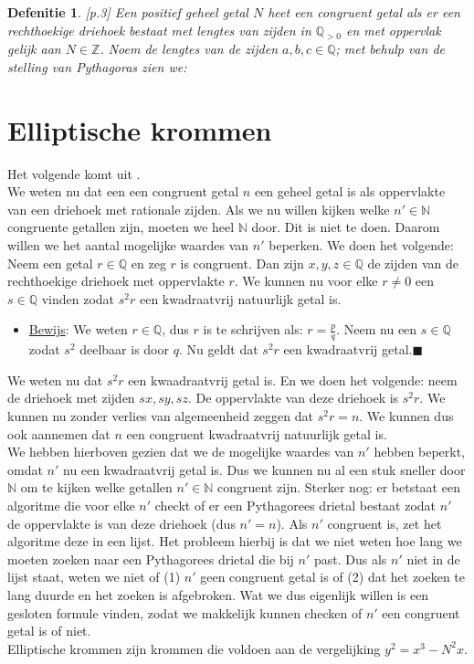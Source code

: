 \documentclass[12pt,reqno]{article}
\newcommand*{\NN}{\ensuremath{\mathbb{N}}}
\newcommand*{\ZZ}{\ensuremath{\mathbb{Z}}}
\newcommand*{\QQ}{\ensuremath{\mathbb{Q}}}
\newcommand*{\QED}{\hfill\ensuremath{\blacksquare}}
\begin{document}
	\newtheorem{CG}{Defenitie}
	\begin{CG}
		\cite{Oort}[p.3] Een positief geheel getal $N$ heet een congruent getal als er een rechthoekige driehoek bestaat met lengtes van zijden in $\QQ_{>0}$ en met oppervlak gelijk aan $N\in\ZZ$. Noem de lengtes van de zijden $a,b,c\in\QQ$; met behulp van de stelling van Pythagoras zien we:
		
	\end{CG}
	
	
	\section{Elliptische krommen}
	Het volgende komt uit \cite{Koblitz}.\\
	We weten nu dat een een congruent getal $n$ een geheel getal is als oppervlakte van een driehoek met rationale zijden. Als we nu willen kijken welke $n'\in\NN$ congruente getallen zijn, moeten we heel $\NN$ door. Dit is niet te doen. Daarom willen we het aantal mogelijke waardes van $n'$ beperken. We doen het volgende:\\
	Neem een getal $r\in\QQ$ en zeg $r$ is congruent. Dan zijn $x,y,z\in\QQ$ de zijden van de rechthoekige driehoek met oppervlakte $r$. We kunnen nu voor elke $r\neq0$ een $s\in\QQ$ vinden zodat $s^2r$ een kwadraatvrij natuurlijk getal is.
	\begin{itemize}
		\item[] \underline{Bewijs}: We weten $r\in\QQ$, dus $r$ is te schrijven als: $r=\frac{p}{q}$. Neem nu een $s\in\QQ$ zodat $s^2$ deelbaar is door $q$. {\color{red}Nu geldt dat $s^2r$ een kwadraatvrij getal.}\QED
	\end{itemize}
	We weten nu dat $s^2r$ een kwaadraatvrij getal is. En we doen het volgende: neem de driehoek met zijden $sx,sy,sz$. De oppervlakte van deze driehoek is $s^2r$. We kunnen nu zonder verlies van algemeenheid zeggen dat $s^2r=n$. We kunnen dus ook aannemen dat $n$ een congruent kwadraatvrij natuurlijk getal is. \\
	
	We hebben hierboven gezien dat we de mogelijke waardes van $n'$ hebben beperkt, omdat $n'$ nu een kwadraatvrij getal is. Dus we kunnen nu al een stuk sneller door $\NN$ om te kijken welke getallen $n'\in\NN$ congruent zijn. Sterker nog: er betstaat een algoritme die voor elke $n'$ checkt of er een Pythagorees drietal bestaat zodat $n'$ de oppervlakte is van deze driehoek (dus $n'=n$). Als $n'$ congruent is, zet het algoritme deze in een lijst. Het probleem hierbij is dat we niet weten hoe lang we moeten zoeken naar een Pythagorees drietal die bij $n'$ past. Dus als $n'$ niet in de lijst staat, weten we niet of (1) $n'$ geen congruent getal is of (2) dat het zoeken te lang duurde en het zoeken is afgebroken. Wat we dus eigenlijk willen is een gesloten formule vinden, zodat we makkelijk kunnen checken of $n'$ een congruent getal is of niet.\\
	
	Elliptische krommen zijn krommen die voldoen aan de vergelijking $y^2=x^3-N^2x$. 
	
	
	
\end{document}
